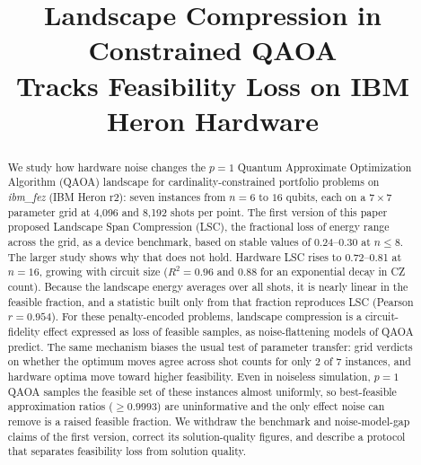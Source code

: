 \documentclass[conference]{IEEEtran}
\begin{document}
\title{Landscape Compression in Constrained QAOA\\
Tracks Feasibility Loss on IBM Heron Hardware}

\author{
}

\maketitle

\begin{abstract}
We study how hardware noise changes the $p{=}1$ Quantum Approximate
Optimization Algorithm (QAOA) landscape for cardinality-constrained
portfolio problems on \textit{ibm\_fez} (IBM Heron r2): seven instances
from $n{=}6$ to $16$ qubits, each on a $7{\times}7$ parameter grid at
4{,}096 and 8{,}192 shots per point. The first version of this paper
proposed Landscape Span Compression (LSC), the fractional loss of energy
range across the grid, as a device benchmark, based on stable values of
0.24--0.30 at $n{\le}8$. The larger study shows why that does not hold.
Hardware LSC rises to 0.72--0.81 at $n{=}16$, growing with circuit size
($R^2{=}0.96$ and $0.88$ for an exponential decay in CZ count). Because
the landscape energy averages over all shots, it is nearly linear in the
feasible fraction, and a statistic built only from that fraction
reproduces LSC (Pearson $r{=}0.954$). For these penalty-encoded problems,
landscape compression is a circuit-fidelity effect expressed as loss of
feasible samples, as noise-flattening models of QAOA predict. The same
mechanism biases the usual test of parameter transfer: grid verdicts on
whether the optimum moves agree across shot counts for only 2 of 7
instances, and hardware optima move toward higher feasibility. Even in
noiseless simulation, $p{=}1$ QAOA samples the feasible set of these
instances almost uniformly, so best-feasible approximation ratios
($\geq0.9993$) are uninformative and the only effect noise can remove is
a raised feasible fraction. We withdraw the benchmark and noise-model-gap
claims of the first version, correct its solution-quality figures, and
describe a protocol that separates feasibility loss from solution
quality.
\end{abstract}
\end{document}
